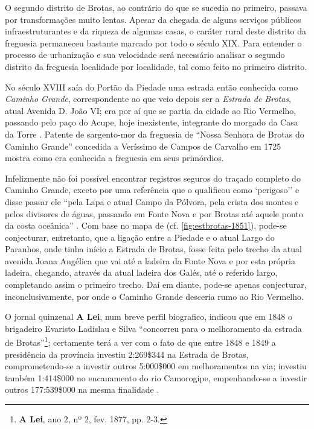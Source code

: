 O segundo distrito de Brotas, ao contrário do que se sucedia no primeiro, passava por transformações muito lentas. Apesar da chegada de alguns serviços públicos infraestruturantes e da riqueza de algumas casas, o caráter rural deste distrito da freguesia permaneceu bastante marcado por todo o século XIX. Para entender o processo de urbanização e sua velocidade será necessário analisar o segundo distrito da freguesia localidade por localidade, tal como feito no primeiro distrito.

No século XVIII saía do Portão da Piedade uma estrada então conhecida como \textit{Caminho Grande}, correspondente ao que veio depois ser a \textit{Estrada de Brotas}, atual Avenida D. João VI; era por aí que se partia da cidade ao Rio Vermelho, passando pelo paço do Acupe, hoje inexistente, integrante do morgado da Casa da Torre \cite[p.~85]{campos_brotas_1942}. Patente de sargento-mor da freguesia de ``Nossa Senhora de Brotas do Caminho Grande'' concedida a Veríssimo de Campos de Carvalho em 1725 \cite[p.~114]{texmel_manusbn_1896} mostra como era conhecida a freguesia em seus primórdios.

Infelizmente não foi possível encontrar registros seguros do traçado completo do Caminho Grande, exceto por uma referência que o qualificou como `perigoso'' e disse passar ele ``pela Lapa e atual Campo da Pólvora, pela crista dos montes e pelos divisores de águas, passando em Fonte Nova e por Brotas até aquele ponto da costa oceânica'' \cite[p.~488]{sampaio_salvador_2016}. Com base no mapa de  (cf. \autoref{fig:estbrotas-1851}), pode-se conjecturar, entretanto, que a ligação entre a Piedade e o atual Largo do Paranhos, onde tinha início a Estrada de Brotas, fosse feita pelo trecho da atual avenida Joana Angélica que vai até a ladeira da Fonte Nova e por esta própria ladeira, chegando, através da atual ladeira dos Galés, até o referido largo, completando assim o primeiro trecho. Daí em diante, pode-se apenas conjecturar, inconclusivamente, por onde o Caminho Grande desceria rumo ao Rio Vermelho.

O jornal quinzenal \textbf{A Lei}, num breve perfil biografico, indicou que em 1848 o brigadeiro Evaristo Ladislau e Silva ``concorreu para o melhoramento da estrada de Brotas''\footnote{\textbf{A Lei}, ano 2, nº 2, fev. 1877, pp. 2-3.}; certamente terá a ver com o fato de que entre 1848 e 1849 a presidência da província investiu 2:269\$344 na Estrada de Brotas, comprometendo-se a investir outros 5:000\$000 em melhoramentos na via; investiu também 1:414\$000 no encanamento do rio Camorogipe, empenhando-se a investir outros 177:539\$000 na mesma finalidade \cite{bahia_rpe_1849}.

